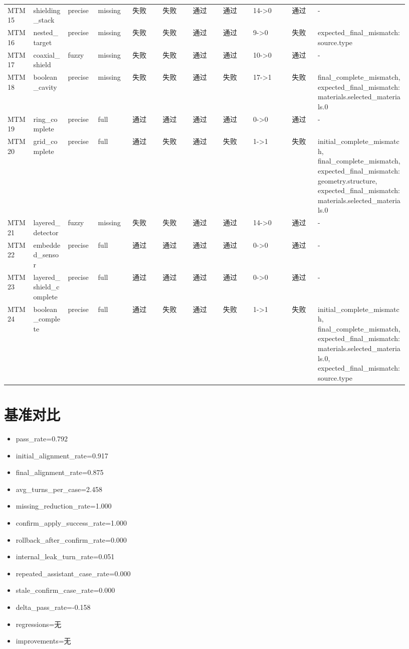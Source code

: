 \documentclass[11pt]{ctexart}
\begin{document}
\begin{longtable}{p{0.06\linewidth}p{0.08\linewidth}p{0.07\linewidth}p{0.08\linewidth}p{0.07\linewidth}p{0.07\linewidth}p{0.07\linewidth}p{0.07\linewidth}p{0.09\linewidth}p{0.06\linewidth}p{0.21\linewidth}}
MTM15 & shielding\_stack & precise & missing & 失败 & 失败 & 通过 & 通过 & 14->0 & 通过 & - \\
MTM16 & nested\_target & precise & missing & 失败 & 失败 & 通过 & 通过 & 9->0 & 失败 & expected\_final\_mismatch:source.type \\
MTM17 & coaxial\_shield & fuzzy & missing & 失败 & 失败 & 通过 & 通过 & 10->0 & 通过 & - \\
MTM18 & boolean\_cavity & precise & missing & 失败 & 失败 & 通过 & 失败 & 17->1 & 失败 & final\_complete\_mismatch, expected\_final\_mismatch:materials.selected\_materials.0 \\
MTM19 & ring\_complete & precise & full & 通过 & 通过 & 通过 & 通过 & 0->0 & 通过 & - \\
MTM20 & grid\_complete & precise & full & 通过 & 失败 & 通过 & 失败 & 1->1 & 失败 & initial\_complete\_mismatch, final\_complete\_mismatch, expected\_final\_mismatch:geometry.structure, expected\_final\_mismatch:materials.selected\_materials.0 \\
MTM21 & layered\_detector & fuzzy & missing & 失败 & 失败 & 通过 & 通过 & 14->0 & 通过 & - \\
MTM22 & embedded\_sensor & precise & full & 通过 & 通过 & 通过 & 通过 & 0->0 & 通过 & - \\
MTM23 & layered\_shield\_complete & precise & full & 通过 & 通过 & 通过 & 通过 & 0->0 & 通过 & - \\
MTM24 & boolean\_complete & precise & full & 通过 & 失败 & 通过 & 失败 & 1->1 & 失败 & initial\_complete\_mismatch, final\_complete\_mismatch, expected\_final\_mismatch:materials.selected\_materials.0, expected\_final\_mismatch:source.type \\
\bottomrule
\end{longtable}
\section{基准对比}
\begin{itemize}
\item pass\_rate=0.792
\item initial\_alignment\_rate=0.917
\item final\_alignment\_rate=0.875
\item avg\_turns\_per\_case=2.458
\item missing\_reduction\_rate=1.000
\item confirm\_apply\_success\_rate=1.000
\item rollback\_after\_confirm\_rate=0.000
\item internal\_leak\_turn\_rate=0.051
\item repeated\_assistant\_case\_rate=0.000
\item stale\_confirm\_case\_rate=0.000
\item delta\_pass\_rate=-0.158
\item regressions=无
\item improvements=无
\end{itemize}
\appendix
\end{document}
